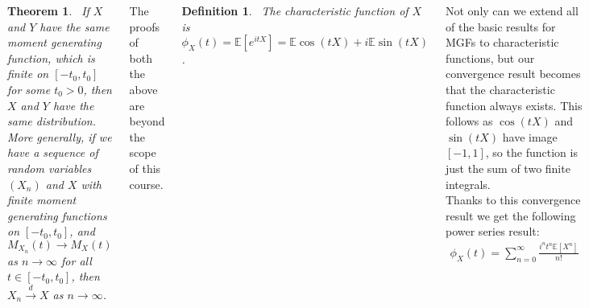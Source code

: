 \documentclass{tikzposter} %
\newtheorem{theorem}{Theorem}
\newtheorem{definition}{Definition}
\begin{document}
\begin{columns}
{  \begin{theorem}
    \ If $X$ and $Y$ have the same moment generating function, which is finite on $[-t_{0}, t_{0}]$ for some $t_{0} > 0$, then $X$ and $Y$ have the same distribution. \\

    More generally, if we have a sequence of random variables $(X_{n})$ and $X$ with finite moment generating functions on $[-t_{0}, t_{0}]$, and $M_{X_{n}}(t) \to M_{X}(t)$ as $n \to \infty$ for all $t \in [-t_{0}, t_{0}]$, then $X_{n} \overset{d}{\to} X$ as $n \to \infty$.
  \end{theorem}
  \hphantom{}

  The proofs of both the above are beyond the scope of this course. \\

  \begin{definition}
  \ The characteristic function of $X$ is $\phi_{X}(t) = \mathbb{E}[e^{itX}] = \mathbb{E} \cos(tX) + i\mathbb{E} \sin(tX)$.
  \end{definition}
  \hphantom{}

  Not only can we extend all of the basic results for MGFs to characteristic functions, but our convergence result becomes that the characteristic function always exists. This follows as $\cos (tX)$ and $\sin (tX)$ have image $[-1,1]$, so the function is just the sum of two finite integrals. \\

  Thanks to this convergence result we get the following power series result:
  \begin{align*}
    \phi_{X}(t) = \sum_{n=0}^{\infty} \frac{i^{n}t^{n}\mathbb{E}[X^{n}]}{n!}
  \end{align*}

  Both the uniqueness and continuity statements hold in a similar way as for MGFs, but as before their proofs are beyond the scope of this course.
}

\end{columns}
\end{document}
